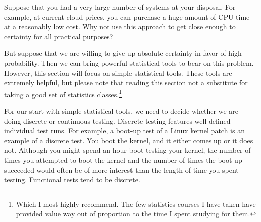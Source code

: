 \QuickQuiz{}
	Suppose that you had a very large number of systems at your
	disposal.
	For example, at current cloud prices, you can purchase a
	huge amount of CPU time at a reasonably low cost.
	Why not use this approach to get close enough to certainty
	for all practical purposes?
 \QuickQuizEnd

But suppose that we are willing to give up absolute certainty in favor
of high probability.
Then we can bring powerful statistical tools to bear on this problem.
However, this section will focus on simple statistical tools.
These tools are extremely helpful, but please note
that reading this section not a substitute
for taking a good set of statistics classes.\footnote{
	Which I most highly recommend.
	The few statistics courses I have taken have provided value
	way out of proportion to the time I spent studying for them.}

For our start with simple statistical tools, we need to decide whether
we are doing discrete or continuous testing.
Discrete testing features well-defined individual test runs.
For example, a boot-up test of a Linux kernel patch is an example
of a discrete test.
You boot the kernel, and it either comes up or it does not.
Although you might spend an hour boot-testing your kernel, the number of
times you attempted to boot the kernel and the number of times the
boot-up succeeded would often be of more interest than the length
of time you spent testing.
Functional tests tend to be discrete.


